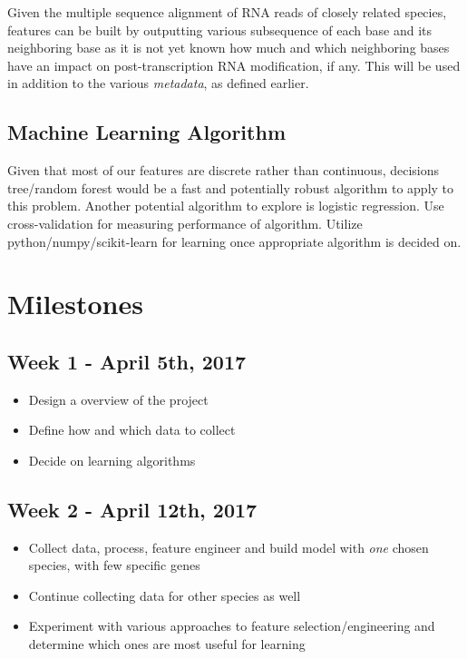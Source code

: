 \documentclass[paper=a4, fontsize=11pt]{scrartcl}
\numberwithin{equation}{section}    %
\numberwithin{figure}{section}      %
\numberwithin{table}{section}       %
\numberwithin{equation}{section}    %
\numberwithin{figure}{section}      %
\numberwithin{table}{section}       %
\begin{document}
Given the multiple sequence alignment of RNA reads of closely related species, features can be built by outputting various subsequence of each base and its neighboring base as it is not yet known how much and which neighboring bases have an impact on post-transcription RNA modification, if any. This will be used in addition to the various \textit{metadata}, as defined earlier. 


\subsection{Machine Learning Algorithm}
Given that most of our features are discrete rather than continuous, decisions tree/random forest would be a fast and potentially robust algorithm to apply to this problem. Another potential algorithm to explore is logistic regression. Use cross-validation for measuring performance of algorithm. Utilize python/numpy/scikit-learn for learning once appropriate algorithm is decided on. 

\section{Milestones}

\subsection{Week 1 - April 5th, 2017}
\begin{itemize}
	\item Design a overview of the project
	\item Define how and which data to collect
	\item Decide on learning algorithms
\end{itemize}

\subsection{Week 2 - April 12th, 2017}
\begin{itemize}
	\item Collect data, process, feature engineer and build model with \textit{one} chosen species, with few specific genes
	\item Continue collecting data for other species as well
	\item Experiment with various approaches to feature selection/engineering and determine which ones are most useful for learning
\end{itemize}
\end{document}
